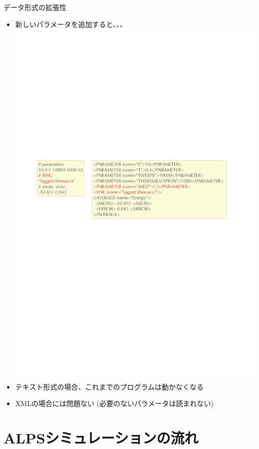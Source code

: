 \begin{frame}{データ形式の拡張性}
  \begin{itemize}
  \item 新しいパラメータを追加すると、、、
  \begin{center}
    \includegraphics[width=.8\textwidth]{xml4.pdf}
  \end{center}
  \item テキスト形式の場合、これまでのプログラムは動かなくなる
  \item XMLの場合には問題ない (必要のないパラメータは読まれない)
  \end{itemize}
\end{frame}

\section{ALPSシミュレーションの流れ}

